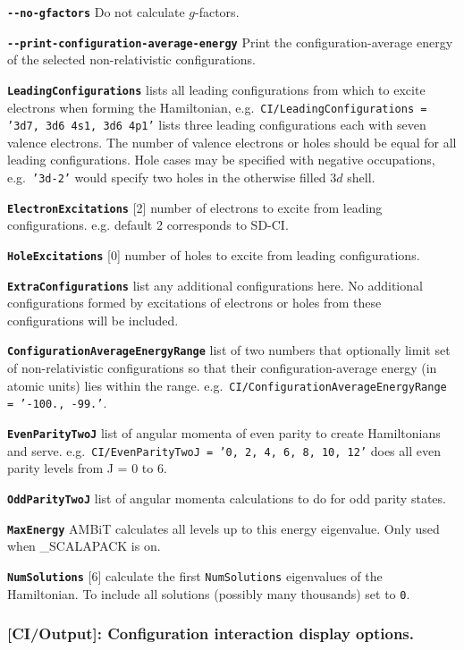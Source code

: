 \documentclass[a4paper,11pt]{article}
\newcommand{\option}[1]{\smallskip\noindent\textbf{\texttt{#1}}}
\newcommand{\code}[1]{\texttt{#1}}
\begin{document}
\option{-{}-no-gfactors} Do not calculate $g$-factors.

\option{-{}-print-configuration-average-energy} Print the configuration-average energy of the selected non-relativistic configurations.

\option{LeadingConfigurations} lists all leading configurations from which to excite electrons when forming the Hamiltonian, e.g.~\texttt{CI/LeadingConfigurations = '3d7, 3d6 4s1, 3d6 4p1'} lists three leading configurations each with seven valence electrons. The number of valence electrons or holes should be equal for all leading configurations. Hole cases may be specified with negative occupations, e.g.~\code{'3d-2'} would specify two holes in the otherwise filled $3d$ shell.

\option{ElectronExcitations} [2] number of electrons to excite from leading configurations. e.g. default 2 corresponds to SD-CI.

\option{HoleExcitations} [0] number of holes to excite from leading configurations.

\option{ExtraConfigurations} list any additional configurations here. No additional configurations formed by excitations of electrons or holes from these configurations will be included.

\option{ConfigurationAverageEnergyRange} list of two numbers that optionally limit set of non-relativistic configurations so that their configuration-average energy (in atomic units) lies within the range. e.g.~\code{CI/ConfigurationAverageEnergyRange = '-100., -99.'}.

\option{EvenParityTwoJ} list of angular momenta of even parity to create Hamiltonians and serve. e.g.~\texttt{CI/EvenParityTwoJ = '0, 2, 4, 6, 8, 10, 12'} does all even parity levels from J = 0 to 6.

\option{OddParityTwoJ} list of angular momenta calculations to do for odd parity states.

\option{MaxEnergy} AMBiT calculates all levels up to this energy eigenvalue. Only used when \_SCALAPACK is on.

\option{NumSolutions} [6] calculate the first \texttt{NumSolutions} eigenvalues of the Hamiltonian. To include all solutions (possibly many thousands) set to \code{0}.

\subsubsection{[CI/Output]: Configuration interaction display options.}
\end{document}
